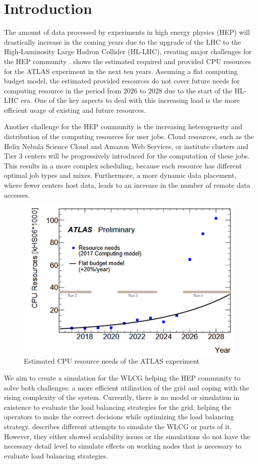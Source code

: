 \documentclass{webofc}
\begin{document}
\section{Introduction}
\label{sec:intro}

The amount of data processed by experiments in high energy physics (HEP) will drastically increase in the coming years due to the upgrade of the LHC to the High-Luminosity Large Hadron Collider (HL-LHC), creating major challenges for the HEP community \cite{community}.
 shows the estimated required and provided CPU resources for the ATLAS experiment in the next ten years. Assuming a flat computing budget model, the estimated provided resources do not cover future needs for computing resource in the period from 2026 to 2028 due to the start of the HL-LHC era. One of the key aspects to deal with this increasing load is the more efficient usage of existing and future resources.

Another challenge for the HEP community is the increasing heterogeneity and distribution of the computing resources for user jobs. Cloud resources, such as the Helix Nebula Science Cloud and Amazon Web Services, or institute clusters and Tier 3 centers will be progressively introduced for the computation of these jobs. This results in a more complex scheduling, because each resource has different optimal job types and mixes. Furthermore, a more dynamic data placement, where fewer centers host data, leads to an increase in the number of remote data accesses.

\begin{figure}
	\centering
	\includegraphics[width=0.5\linewidth]{images/resources}
	\caption[]{Estimated CPU resource needs of the ATLAS experiment\cite{community}}
	\label{resources}
\end{figure}

We aim to create a simulation for the WLCG helping the HEP community to solve both challenges: a more efficient utilization of the grid and coping with the rising complexity of the system.
Currently, there is no model or simulation in existence to evaluate the load balancing strategies for the grid, helping the operators to make the correct decisions while optimizing the load balancing strategy.
 describes different attempts to simulate the WLCG or parts of it. However, they either showed scalability issues or the simulations do not have the necessary detail level to simulate effects on working nodes that is necessary to evaluate load balancing strategies.
\end{document}
